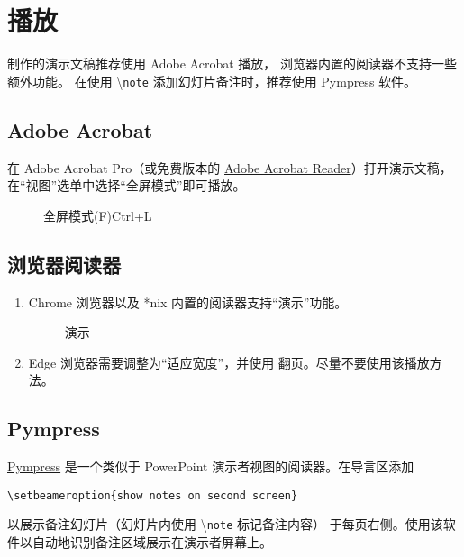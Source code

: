 \documentclass[
    UTF8,
    heading=true,
    12pt,
    a4paper
]{ctexrep}
\newcommand{\cmd}[1]{\textbackslash{}\texttt{#1}}
\begin{document}
\chapter{播放}

制作的演示文稿推荐使用 Adobe Acrobat 播放，
浏览器内置的阅读器不支持一些额外功能。
在使用 \cmd{note} 添加幻灯片备注时，推荐使用 Pympress 软件。

\section{Adobe Acrobat}

在 Adobe Acrobat Pro（或免费版本的
\href{https://www.adobe.com/cn/acrobat/pdf-reader.html}{Adobe Acrobat
Reader}）打开演示文稿，在“视图”选单中选择“全屏模式”即可播放。

\begin{figure}[h]
  \centering
  \begin{tcolorbox}[enhanced, title={视图(V)},
    attach boxed title to top left, boxed title
    style={sharp corners}, sharp corners, tile,
    width=6cm]
    \faTv{} 全屏模式(F)\hfill Ctrl+L
  \end{tcolorbox}
\end{figure}

\section{浏览器阅读器}

\begin{enumerate}
  \item[\faChrome] Chrome 浏览器以及 *nix
    内置的阅读器支持“演示”功能。
    \begin{figure}[h]
      \centering
      \begin{tcolorbox}[enhanced,
          title={$\vdots$}, attach boxed
          title to top
          right, boxed title style={
              circular arc, top=0mm,
              bottom=2mm,
              left=3.25mm, right=3.25mm
            },
          sharp corners, tile, width=6cm]
        演示
      \end{tcolorbox}
    \end{figure}
  \item[\faInternetExplorer] Edge
    浏览器需要调整为“适应宽度”\fbox{\faArrowsAltH}，并使用
     翻页。尽量不要使用该播放方法。
\end{enumerate}

\section{Pympress}
\href{https://github.com/Cimbali/pympress}{Pympress}
是一个类似于 PowerPoint 演示者视图的阅读器。在导言区添加
\begin{verbatim}
\setbeameroption{show notes on second screen}
\end{verbatim}
以展示备注幻灯片（幻灯片内使用 \cmd{note} 标记备注内容）
于每页右侧。使用该软件以自动地识别备注区域展示在演示者屏幕上。
\end{document}
